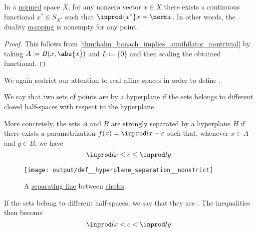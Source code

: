 \begin{corollary}\label{thm:hahn_banach_implies_duality_mapping_nonempty}
  In a \hyperref[def:norm]{normed} space \( X \), for any nonzero vector \( x \in X \) there exists a continuous functional \( x^* \in S_{X^*} \) such that \( \inprod {x^*} x = \norm x \). In other words, the duality \hyperref[def:duality_mapping]{mapping} is nonempty for any point.
\end{corollary}
\begin{proof}
  This follows from \cref{thm:hahn_banach_implies_annihilator_nontrivial} by taking \( A \coloneqq B(x, \abs{x}) \) and \( L \coloneqq \{ 0 \} \) and then scaling the obtained functional.
\end{proof}

\begin{definition}\label{def:hyperplane_separation}
  We again restrict our attention to real affine spaces in order to define .

  \begin{thmenum}
     We say that two sets of points are  by a \hyperref[def:affine_hyperplane]{hyperplane} if the sets belongs to different closed half-spaces with respect to the hyperplane.

    More concretely, the sets \( A \) and \( B \) are strongly separated by a hyperplane \( H \) if there exists a parametrization \( f(x) = \inprod l x - c \) such that, whenever \( x \in A \) and \( y \in B \), we have
    \begin{equation}\label{eq:def:hyperplane_separation/nonstrict}
      \inprod l x \leq c \leq \inprod l y.
    \end{equation}

    \begin{figure}[!ht]
      \centering
      \texttt{[image: output/def\_\_hyperplane\_separation\_\_nonstrict]}
      \caption{A \hyperref[def:hyperplane_separation/nonstrict]{separating line} between \hyperref[def:circle]{circles}.}\label{fig:def:hyperplane_separation/nonstrict}
    \end{figure}

     If the sets belong to different  half-spaces, we say that they are . The inequalities then become
    \begin{equation}\label{eq:def:hyperplane_separation/strong}
      \inprod l x < c < \inprod l y.
    \end{equation}


\end{thmenum}
\end{definition}
